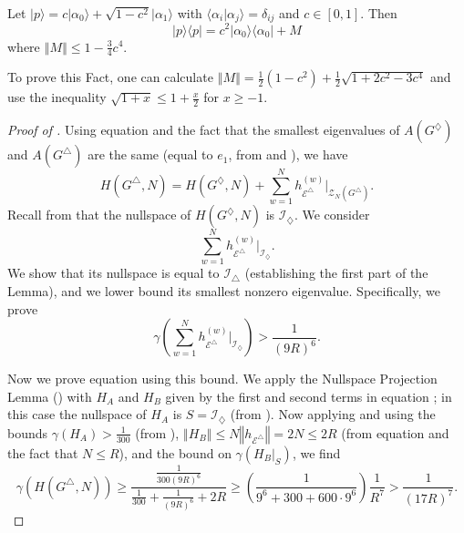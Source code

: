 \documentclass[../thesis-main/thesis-main]{subfiles}
\begin{document}
\begin{fact}
\label{fct:lin_alg_fact}
Let $|p\rangle=c|\alpha_{0}\rangle+\sqrt{1-c^{2}}|\alpha_{1}\rangle$ with $\langle\alpha_{i}|\alpha_{j}\rangle=\delta_{ij}$ and $c\in[0,1]$. Then
\[
|p\rangle\langle p|=c^{2}|\alpha_{0}\rangle\langle\alpha_{0}|+M
\]
where $\left\Vert M\right\Vert \leq1-\frac{3}{4}c^{4}$.
\end{fact}

To prove this Fact, one can calculate $\left\Vert M\right\Vert =\frac{1}{2}(1-c^{2})+\frac{1}{2}\sqrt{1+2c^{2}-3c^{4}}$ and use the inequality $\sqrt{1+x}\leq1+\frac{x}{2}$ for $x\geq-1$.

\begin{proof}[Proof of \protect{}]
Using equation  and the fact that the smallest eigenvalues of $A(G^{\diamondsuit})$ and $A(G^{\triangle})$ are the same (equal to $e_{1}$, from  and ), we have
\begin{equation}
H(G^{\triangle},N)=H(G^{\diamondsuit},N)+\sum_{w=1}^{N}h_{\mathcal{E}^{\triangle}}^{(w)}\bigg|_{\mathcal{Z}_{N}(G^{\triangle})}.\label{eq:H_G^triangle,diamond}
\end{equation}
Recall from  that the nullspace of $H(G^{\diamondsuit},N)$ is $\mathcal{\mathcal{I}_{\diamondsuit}}$. We consider 
\begin{equation}
\sum_{w=1}^{N}h_{\mathcal{E}^{\triangle}}^{(w)}\bigg|_{\mathcal{I}_{\diamondsuit}}.\label{eq:restriction to script R}
\end{equation}
We show that its nullspace is equal to $\mathcal{I}_{\triangle}$ (establishing the first part of the Lemma), and we lower bound its smallest nonzero eigenvalue. Specifically, we prove
\begin{equation}
\gamma\left(\sum_{w=1}^{N}h_{\mathcal{E}^{\triangle}}^{(w)}\bigg|_{\mathcal{I}_{\diamondsuit}}\right)>\frac{1}{(9R)^{6}}.\label{eq:bound_R6}
\end{equation}

Now we prove equation  using this bound. We apply the Nullspace Projection Lemma () with $H_{A}$ and $H_{B}$ given by the first and second terms in equation ; in this case the nullspace of $H_{A}$ is $S=\mathcal{I}_{\diamondsuit}$ (from ). Now applying  and using the bounds $\gamma(H_{A})>\frac{1}{300}$ (from ), $\left\Vert H_{B}\right\Vert \leq N\left\Vert h_{\mathcal{E}^{\triangle}}\right\Vert =2N\leq2R$ (from equation  and the fact that $N\leq R$), and the bound  on $\gamma(H_{B}|_{S})$, we find
\[
\gamma(H(G^{\triangle},N))\geq\frac{\frac{1}{300(9R)^{6}}}{\frac{1}{300}+\frac{1}{(9R)^{6}}+2R}\geq\left(\frac{1}{9^6+300+600\cdot 9^6}\right)\frac{1}{R^{7}}>\frac{1}{\left(17R\right)^{7}}.
\]


\end{proof}
\end{document}
